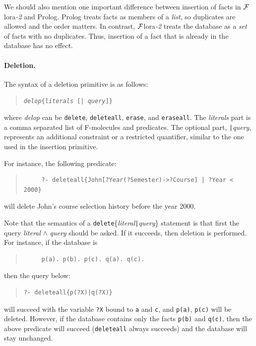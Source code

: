 \documentclass[11pt]{article}
\newcommand{\FLORA}{{\mbox{\sc ${\cal F}${lora}\rm\emph{-2}}}\xspace}
\begin{document}
We should also mention one important difference between insertion of facts
in \FLORA and Prolog. Prolog treats facts as members of a \emph{list}, so
duplicates are allowed and the order matters. In contrast, \FLORA treats
the database as a \emph{set} of facts with no duplicates. Thus, insertion
of a fact that is already in the database has no effect.


%
\paragraph{Deletion.} The syntax of a deletion primitive is as follows:
\begin{quote}
{\tt \emph{delop}\{\emph{literals} [| \emph{query}]\}}
\end{quote}
where {\it delop} can be {\tt delete}, {\tt deleteall}, {\tt erase}, and
{\tt eraseall}. The {\it literals} part is a comma separated list of
F-molecules and predicates. The optional part, {\tt |}\emph{query},
represents an additional constraint or a restricted quantifier, similar
to the one used in the insertion primitive.

For instance, the following predicate:
\begin{quote}
\begin{verbatim}
     ?- deleteall{John[?Year(?Semester)->?Course] | ?Year < 2000}
\end{verbatim}
\end{quote}
will delete John's course selection history before the year 2000.

Note that the semantics of a {\tt delete}\{\emph{literal}{\tt |}{\it query}\}
statement is that first the query \emph{literal} $\wedge$ \emph{query} should
be asked. If it succeeds, then deletion is performed. For instance, if the
database is
\begin{quote}
\begin{verbatim}
     p(a). p(b). p(c). q(a). q(c).
\end{verbatim}
\end{quote}
then the query below:
\begin{quote}
\begin{verbatim}
?- deleteall{p(?X)|q(?X)}
\end{verbatim}
\end{quote}
will succeed with the variable {\tt ?X} bound to {\tt a} and {\tt c}, and
{\tt p(a)}, {\tt p(c)} will be deleted.  However, if the database contains
only the facts {\tt p(b)} and {\tt q(c)}, then the above predicate will
succeed ({\tt deleteall} always succeeds) and the database will stay
unchanged.
\end{document}
